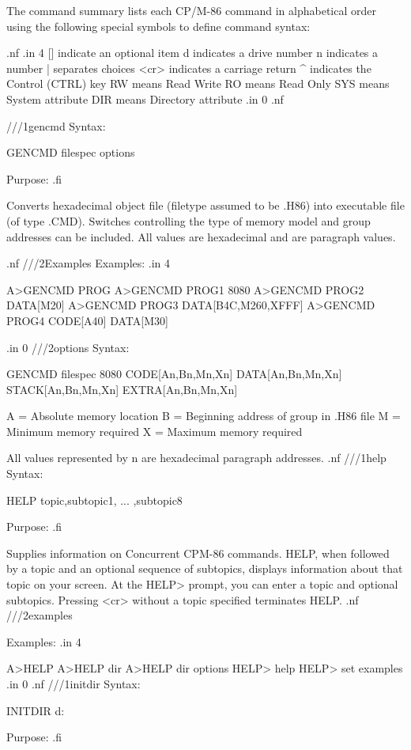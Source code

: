 The command summary lists each CP/M-86 command in alphabetical
order using the following special symbols to define command
syntax: 

.nf
.in 4
[]   indicate an optional item
d    indicates a drive number
n    indicates a number
|    separates choices
<cr> indicates a carriage return
^    indicates the Control (CTRL) key
RW   means Read Write 
RO   means Read Only
SYS  means System attribute
DIR  means Directory attribute
.in 0
.nf

///1gencmd
Syntax:

GENCMD filespec {options}

Purpose:
.fi

Converts hexadecimal object file (filetype assumed to be .H86)
into executable file (of type .CMD). Switches controlling the
type of memory model and group addresses can be included.  
All values are hexadecimal and are paragraph values. 

.nf
///2Examples
Examples:
.in 4

A>GENCMD PROG
A>GENCMD PROG1 8080
A>GENCMD PROG2 DATA[M20]
A>GENCMD PROG3 DATA[B4C,M260,XFFF]
A>GENCMD PROG4 CODE[A40] DATA[M30]

.in 0
///2options
Syntax:

GENCMD filespec  {8080
                  CODE[An,Bn,Mn,Xn]
                  DATA[An,Bn,Mn,Xn]
                 STACK[An,Bn,Mn,Xn]
                 EXTRA[An,Bn,Mn,Xn]}

   A = Absolute memory location
   B = Beginning address of group in .H86 file
   M = Minimum memory required
   X = Maximum memory required

All values represented by n are hexadecimal paragraph addresses.
.nf
///1help
Syntax:
 
HELP {topic,subtopic1, ... ,subtopic8}

Purpose:
.fi

Supplies information on Concurrent CPM-86 commands.  HELP, when 
followed by a topic and an optional sequence of subtopics, displays
information about that topic on your screen. At the HELP> prompt, 
you can enter a topic and optional subtopics. Pressing <cr>
without a topic specified terminates HELP. 
.nf
///2examples

Examples:
.in 4

A>HELP
A>HELP dir
A>HELP dir options
HELP> help
HELP> set examples
.in 0
.nf
///1initdir
Syntax:

INITDIR d:

Purpose:
.fi

